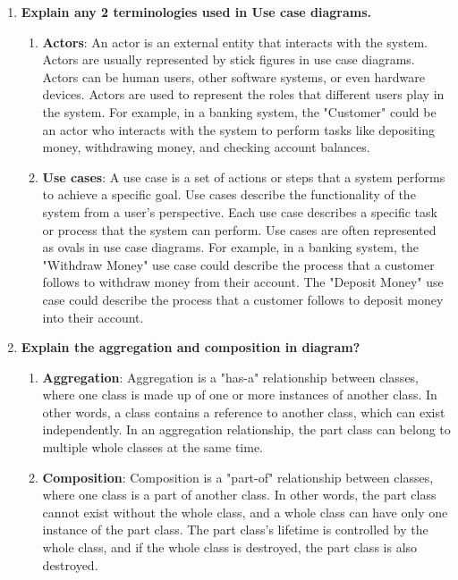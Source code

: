 \documentclass[11pt]{article}
\begin{document}
\begin{enumerate}
	\item \textbf{Explain any 2 terminologies used in Use case diagrams.}\\

	      \begin{enumerate}
		      \item \textbf{Actors}: An actor is an external entity that interacts with the system. Actors are usually represented by stick figures in use case diagrams. Actors can be human users, other software systems, or even hardware devices. Actors are used to represent the roles that different users play in the system. For example, in a banking system, the "Customer" could be an actor who interacts with the system to perform tasks like depositing money, withdrawing money, and checking account balances.

		      \item \textbf{Use cases}: A use case is a set of actions or steps that a system performs to achieve a specific goal. Use cases describe the functionality of the system from a user's perspective. Each use case describes a specific task or process that the system can perform. Use cases are often represented as ovals in use case diagrams. For example, in a banking system, the "Withdraw Money" use case could describe the process that a customer follows to withdraw money from their account. The "Deposit Money" use case could describe the process that a customer follows to deposit money into their account.
	      \end{enumerate}

	\item \textbf{Explain the aggregation and composition in diagram?}\\

	      \begin{enumerate}
		      \item \textbf{Aggregation}: Aggregation is a "has-a" relationship between classes, where one class is made up of one or more instances of another class. In other words, a class contains a reference to another class, which can exist independently. In an aggregation relationship, the part class can belong to multiple whole classes at the same time.

		      \item \textbf{Composition}: Composition is a "part-of" relationship between classes, where one class is a part of another class. In other words, the part class cannot exist without the whole class, and a whole class can have only one instance of the part class. The part class's lifetime is controlled by the whole class, and if the whole class is destroyed, the part class is also destroyed.
	      \end{enumerate}

\end{enumerate}
\end{document}
